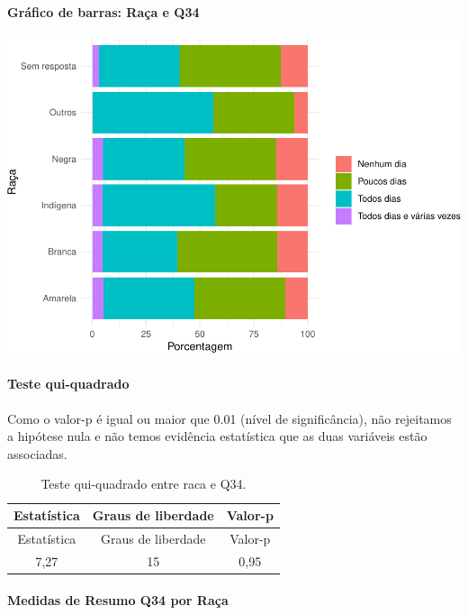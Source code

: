 \documentclass[]{article}
\let\oldparagraph\paragraph
\renewcommand{\paragraph}[1]{\oldparagraph{#1}\mbox{}}
\begin{document}
\hypertarget{gruxe1fico-de-barras-rauxe7a-e-q34}{%
\paragraph{Gráfico de barras: Raça e Q34}\label{gruxe1fico-de-barras-rauxe7a-e-q34}}

\begin{center}\includegraphics[width=0.75\linewidth]{relatorio_covid19_files/figure-latex/unnamed-chunk-1223-1} \end{center}

\hypertarget{teste-qui-quadrado-105}{%
\paragraph{Teste qui-quadrado}\label{teste-qui-quadrado-105}}

Como o valor-p é igual ou maior que 0.01 (nível de significância), não rejeitamos a hipótese nula e não temos evidência estatística que as duas variáveis estão associadas.

\begin{longtable}[]{@{}ccc@{}}
\caption{\label{tab:unnamed-chunk-1225}Teste qui-quadrado entre raca e Q34.}\tabularnewline
\toprule
Estatística & Graus de liberdade & Valor-p\tabularnewline
\midrule
\endfirsthead
\toprule
Estatística & Graus de liberdade & Valor-p\tabularnewline
\midrule
\endhead
7,27 & 15 & 0,95\tabularnewline
\bottomrule
\end{longtable}

\cleardoublepage

\hypertarget{medidas-de-resumo-q34-por-rauxe7a}{%
\paragraph{Medidas de Resumo Q34 por Raça}\label{medidas-de-resumo-q34-por-rauxe7a}}
\end{document}

